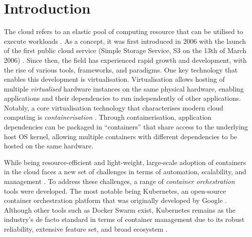 
\newpage

\tableofcontents


\newpage


\chapter{Introduction}

The cloud refers to an elastic pool of computing resource that can be utilised to execute workloads \cite{editorCloudComputingGlossary}. As a concept, it was first introduced in 2006 with the launch of the first public cloud service (Simple Storage Service, S3 on the 13th of March 2006) \cite{liuReviewDigitalTwin2021}. Since then, the field has experienced rapid growth and development, with the rise of various tools, frameworks, and paradigms. One key technology that enables this development is virtualisation. Virtualisation allows hosting of multiple \textit{virtualised} hardware instances on the same physical hardware, enabling applications and their dependencies to run independently of other applications. Notably, a core virtualisation technology that characterises modern cloud computing is \textit{containerisation} \cite{pereiraferreiraPerformanceEvaluationContainers2019}. Through containerisation, application dependencies can be packaged in “containers” that share access to the underlying host OS kernel, allowing multiple containers with different dependencies to be hosted on the same hardware.


While being resource-efficient and light-weight, large-scale adoption of containers in the cloud faces a new set of challenges in terms of automation, scalability, and management \cite{pereiraferreiraPerformanceEvaluationContainers2019,felterUpdatedPerformanceComparison2015}. To address these challenges, a range of \textit{container orchestration} tools were developed. The most notable being Kubernetes, an open-source container orchestration platform that was originally developed by Google \cite{Kubernetes, pereiraferreiraPerformanceEvaluationContainers2019}. Although other tools such as Docker Swarm exist, Kubernetes remains as the industry’s de facto standard in terms of container management due to its robust reliability, extensive feature set, and broad ecosystem \cite{truyenComprehensiveFeatureComparison2019,KubernetesKubernetesProductionGrade,SwarmMode0200}.

